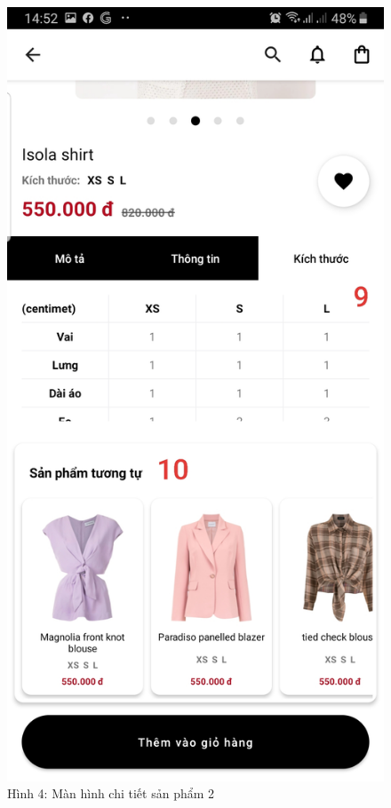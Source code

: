 \documentclass{beamer}
\begin{document}
\begin{frame}
    \begin{columns}
        \begin{figure}
            \centering
            \includegraphics[height=0.7\textheight]{images/05.png}
            \caption{\centering\tiny{Hình 4: Màn hình chi tiết sản phẩm 2}}


\end{figure}
\end{columns}
\end{frame}
\end{document}
